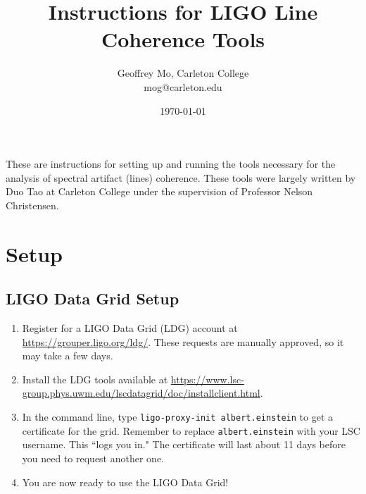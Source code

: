 \documentclass[11pt]{article}
\begin{document}
\title{Instructions for LIGO Line Coherence Tools}
\date{\today}
\author{Geoffrey Mo, Carleton College\\mog@carleton.edu}

\maketitle

These are instructions for setting up and running the tools necessary for the analysis of spectral artifact (lines) coherence. These tools were largely written by Duo Tao at Carleton College under the supervision of Professor Nelson Christensen. 

\section*{Setup}
\subsection*{LIGO Data Grid Setup}
\begin{enumerate}
	\item Register for a LIGO Data Grid (LDG) account at \url{https://grouper.ligo.org/ldg/}. These requests are manually approved, so it may take a few days.
	\item Install the LDG tools available at \url{https://www.lsc-group.phys.uwm.edu/lscdatagrid/doc/installclient.html}.
	\item In the command line, type {\tt ligo-proxy-init albert.einstein} to get a certificate for the grid. Remember to replace {\tt albert.einstein} with your LSC username. This ``logs you in." The certificate will last about 11 days before you need to request another one.
	\item You are now ready to use the LIGO Data Grid!
\end{enumerate}
\end{document}
